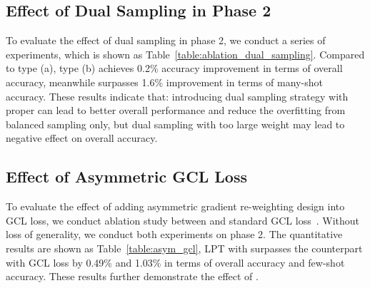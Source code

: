 \documentclass{article} \usepackage{iclr2023_conference,times}
\begin{document}
\subsection{Effect of Dual Sampling in Phase 2}\label{sec:ablation_dualsample}
To evaluate the effect of dual sampling in phase 2, we conduct a series of experiments, which is shown as Table~\ref{table:ablation_dual_sampling}. Compared to type (a), type (b) achieves 0.2\% accuracy improvement in terms of overall accuracy, meanwhile surpasses 1.6\% improvement in terms of many-shot accuracy.
These results indicate that: introducing dual sampling strategy with proper  can lead to better overall performance and reduce the overfitting from balanced sampling only, but dual sampling with too large weight may lead to negative effect on overall accuracy. 

\subsection{Effect of Asymmetric GCL Loss}\label{sec:ablation_agcl}
To evaluate the effect of adding asymmetric gradient re-weighting design into GCL loss, we conduct ablation study between  and standard GCL loss~\cite{Li2022Long}. Without loss of generality, we conduct both experiments on phase 2. The quantitative results are shown as Table~\ref{table:asym_gcl}, LPT with  surpasses the counterpart with GCL loss by 0.49\% and 1.03\% in terms of overall accuracy and few-shot accuracy. These results further demonstrate the effect of .

\begin{table}
\centering
   \caption{Fair comparison with multi-task learning methods on Places-LT dataset. All methods start from the same IN21K pretrained ViT-B feature extractor to conduct fully fine-tuning or prompt tuning. Quantitative results show that LPT still surpasses multi-task learning method by a large margin.}
\setlength{\tabcolsep}{5.6pt} \renewcommand{\arraystretch}{3.5}{ \fontsize{8.3}{3}}
   \label{table:comp_multitask_same_vitb}
\end{table}
\end{document}
